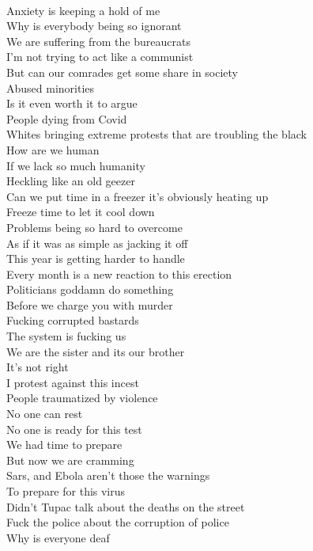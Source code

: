 \documentclass[12pt, b5paper]{article}
\begin{document}
\\Anxiety is keeping a hold of me
\\Why is everybody being so ignorant
\\We are suffering from the bureaucrats
\\I'm not trying to act like a communist
\\But can our comrades get some share in society
\\Abused minorities
\\Is it even worth it to argue
\\People dying from Covid
\\Whites bringing extreme protests that are troubling the black
\\How are we human
\\If we lack so much humanity
\\Heckling like an old geezer
\\Can we put time in a freezer it's obviously heating up
\\Freeze time to let it cool down
\\Problems being so hard to overcome
\\As if it was as simple as jacking it off
\\This year is getting harder to handle
\\Every month is a new reaction to this erection
\\Politicians goddamn do something
\\Before we charge you with murder
\\Fucking corrupted bastards
\\The system is fucking us
\\We are the sister and its our brother
\\It's not right
\\I protest against this incest
\\People traumatized by violence
\\No one can rest
\\No one is ready for this test
\\We had time to prepare
\\But now we are cramming
\\Sars, and Ebola aren't those the warnings
\\To prepare for this virus
\\Didn't Tupac talk about the deaths on the street
\\Fuck the police about the corruption of police
\\Why is everyone deaf
\end{document}
